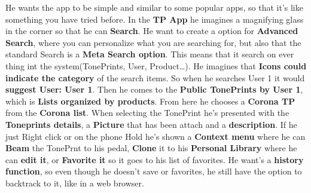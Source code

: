 He wants the app to be simple and similar to some popular apps, so that it’s like something you have tried before. In the \textbf{TP App} he imagines a magnifying glass in the corner so that he can \textbf{Search}. He want to create a option for \textbf{Advanced Search}, where you can personalize what you are searching for, but also that the standard Search is a \textbf{Meta Search option}. This means that it search on ever thing int the system(TonePrints, User, Product…). He imagines that \textbf{Icons could indicate the category} of the search items. So when he searches User 1 it would \textbf{suggest User: User 1}. Then he comes to the \textbf{Public TonePrints by User 1}, which is \textbf{Lists organized by products}. From here he chooses a \textbf{Corona TP} from the \textbf{Corona list}. When selecting the TonePrint he’s presented with the \textbf{Toneprints details}, a \textbf{Picture} that has been attach and a \textbf{description}. If he just Right click or on the phone Hold he’s shown a \textbf{Context menu} where he can \textbf{Beam} the TonePrnt to his pedal, \textbf{Clone} it to his \textbf{Personal Library} where he can \textbf{edit it}, or \textbf{Favorite it} so it goes to his list of favorites. He want’s a \textbf{history function}, so even though he doesn’t save or favorites, he still have the option to backtrack to it, like in a web browser. 


